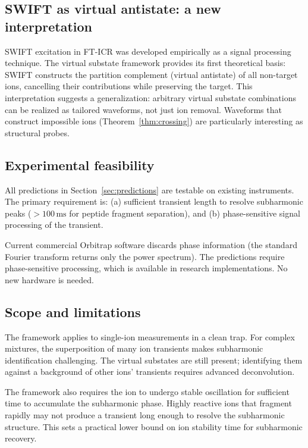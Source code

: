 \documentclass[twocolumn,10pt,a4paper]{article}
\theoremstyle{thmstyle}
\theoremstyle{definition}
\theoremstyle{remark}
\begin{document}
\subsection{SWIFT as virtual antistate: a new interpretation}

SWIFT excitation in FT-ICR \citep{swift1985} was developed empirically
as a signal processing technique. The virtual substate framework
provides its first theoretical basis: SWIFT constructs the partition
complement (virtual antistate) of all non-target ions, cancelling their
contributions while preserving the target. This interpretation suggests
a generalization: arbitrary virtual substate combinations can be realized
as tailored waveforms, not just ion removal. Waveforms that construct
impossible ions (Theorem~\ref{thm:crossing}) are particularly interesting
as structural probes.

\subsection{Experimental feasibility}

All predictions in Section~\ref{sec:predictions} are testable on
existing instruments. The primary requirement is:
(a) sufficient transient length to resolve subharmonic peaks
($>100\,\mathrm{ms}$ for peptide fragment separation), and
(b) phase-sensitive signal processing of the transient.

Current commercial Orbitrap software discards phase information
(the standard Fourier transform returns only the power spectrum). The
predictions require phase-sensitive processing, which is available in
research implementations. No new hardware is needed.

\subsection{Scope and limitations}

The framework applies to single-ion measurements in a clean trap.
For complex mixtures, the superposition of many ion transients makes
subharmonic identification challenging. The virtual substates are still
present; identifying them against a background of other ions' transients
requires advanced deconvolution.

The framework also requires the ion to undergo stable oscillation for
sufficient time to accumulate the subharmonic phase. Highly reactive
ions that fragment rapidly may not produce a transient long enough to
resolve the subharmonic structure. This sets a practical lower bound on
ion stability time for subharmonic recovery.
\end{document}

